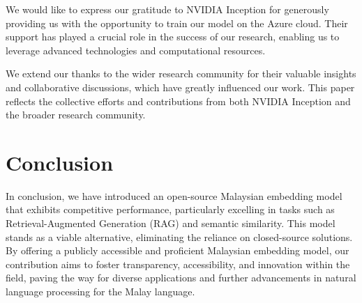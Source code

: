 \documentclass[preprint]{article}
\begin{document}
We would like to express our gratitude to NVIDIA Inception for generously providing us with the opportunity to train our model on the Azure cloud. Their support has played a crucial role in the success of our research, enabling us to leverage advanced technologies and computational resources.

We extend our thanks to the wider research community for their valuable insights and collaborative discussions, which have greatly influenced our work. This paper reflects the collective efforts and contributions from both NVIDIA Inception and the broader research community.

\section{Conclusion}

In conclusion, we have introduced an open-source Malaysian embedding model that exhibits competitive performance, particularly excelling in tasks such as Retrieval-Augmented Generation (RAG) and semantic similarity. This model stands as a viable alternative, eliminating the reliance on closed-source solutions. By offering a publicly accessible and proficient Malaysian embedding model, our contribution aims to foster transparency, accessibility, and innovation within the field, paving the way for diverse applications and further advancements in natural language processing for the Malay language.

{}

\end{document}

